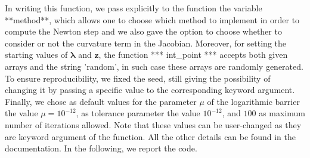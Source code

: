 \documentclass[a4paper,11pt]{article}
\begin{document}
\noindent In writing this function, we pass explicitly to the function the variable **method**, which allows one to choose which method to implement in order to compute the Newton step and we also gave the option to choose whether to consider or not the curvature term in the Jacobian. Moreover, for setting the starting values of $\boldsymbol{\lambda}$ and $\textbf{z}$, the function *** int\_point *** accepts both given arrays and the string 'random', in such case these arrays are randomly generated. To ensure reproducibility, we fixed the seed, still giving the possibility of changing it by passing a specific value to the corresponding keyword argument.  Finally, we chose as default values for the parameter $\mu$ of the logarithmic barrier the value $\mu = 10^{-12}$, as tolerance parameter the value $10^{-12}$, and $100$ as maximum number of iterations allowed. Note that these values can be user-changed as they are keyword argument of the function. All the other details can be found in the documentation. In the following, we report the code.
\end{document}
